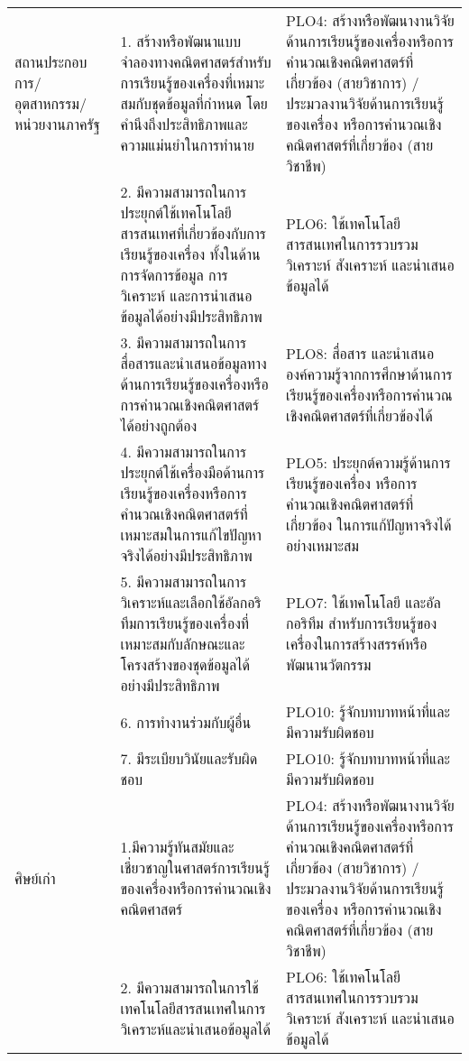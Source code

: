 \begin{longtable}{|p{} | p{}| p{} |}
สถานประกอบการ/ \newline อุตสาหกรรม\newline /หน่วยงานภาครัฐ	
&1. สร้างหรือพัฒนาแบบจำลองทางคณิตศาสตร์สำหรับการเรียนรู้ของเครื่องที่เหมาะสมกับชุดข้อมูลที่กำหนด โดยคำนึงถึงประสิทธิภาพและความแม่นยำในการทำนาย
&PLO4: สร้างหรือพัฒนางานวิจัยด้านการเรียนรู้ของเครื่องหรือการคำนวณเชิงคณิตศาสตร์ที่เกี่ยวข้อง (สายวิชาการ) / ประมวลงานวิจัยด้านการเรียนรู้ของเครื่อง หรือการคำนวณเชิงคณิตศาสตร์ที่เกี่ยวข้อง (สายวิชาชีพ) \\ \cline{2-3}
&2. มีความสามารถในการประยุกต์ใช้เทคโนโลยีสารสนเทศที่เกี่ยวข้องกับการเรียนรู้ของเครื่อง ทั้งในด้านการจัดการข้อมูล การวิเคราะห์ และการนำเสนอข้อมูลได้อย่างมีประสิทธิภาพ	 & PLO6: ใช้เทคโนโลยีสารสนเทศในการรวบรวม วิเคราะห์ สังเคราะห์ และนำเสนอข้อมูลได้ \\ \cline{2-3}
&3. มีความสามารถในการสื่อสารและนำเสนอข้อมูลทางด้านการเรียนรู้ของเครื่องหรือการคำนวณเชิงคณิตศาสตร์ได้อย่างถูกต้อง	& PLO8: สื่อสาร และนำเสนอ องค์ความรู้จากการศึกษาด้านการเรียนรู้ของเครื่องหรือการคำนวณเชิงคณิตศาสตร์ที่เกี่ยวข้องได้ \\ \cline{2-3}
&4. มีความสามารถในการประยุกต์ใช้เครื่องมือด้านการเรียนรู้ของเครื่องหรือการคำนวณเชิงคณิตศาสตร์ที่เหมาะสมในการแก้ไขปัญหาจริงได้อย่างมีประสิทธิภาพ & PLO5: ประยุกต์ความรู้ด้านการเรียนรู้ของเครื่อง หรือการคำนวณเชิงคณิตศาสตร์ที่เกี่ยวข้อง ในการแก้ปัญหาจริงได้อย่างเหมาะสม \\ \cline{2-3}
&5. มีความสามารถในการวิเคราะห์และเลือกใช้อัลกอริทึมการเรียนรู้ของเครื่องที่เหมาะสมกับลักษณะและโครงสร้างของชุดข้อมูลได้อย่างมีประสิทธิภาพ &	 PLO7: ใช้เทคโนโลยี และอัลกอริทึม สำหรับการเรียนรู้ของเครื่องในการสร้างสรรค์หรือพัฒนานวัตกรรม \\ \cline{2-3}
&6. การทำงานร่วมกับผู้อื่น &	PLO10: รู้จักบทบาทหน้าที่และมีความรับผิดชอบ \\ \cline{2-3} 
&7. มีระเบียบวินัยและรับผิดชอบ	 & PLO10: รู้จักบทบาทหน้าที่และมีความรับผิดชอบ \\ \hline

ศิษย์เก่า & 
1.มีความรู้ทันสมัยและเชี่ยวชาญในศาสตร์การเรียนรู้ของเครื่องหรือการคำนวณเชิงคณิตศาสตร์	& PLO4: สร้างหรือพัฒนางานวิจัยด้านการเรียนรู้ของเครื่องหรือการคำนวณเชิงคณิตศาสตร์ที่เกี่ยวข้อง (สายวิชาการ) / ประมวลงานวิจัยด้านการเรียนรู้ของเครื่อง หรือการคำนวณเชิงคณิตศาสตร์ที่เกี่ยวข้อง (สายวิชาชีพ) 
\\ \cline{2-3}
&2. มีความสามารถในการใช้เทคโนโลยีสารสนเทศในการวิเคราะห์และนำเสนอข้อมูลได้	&PLO6: ใช้เทคโนโลยีสารสนเทศในการรวบรวม วิเคราะห์ สังเคราะห์ และนำเสนอข้อมูลได้ \\ 

\end{longtable}


